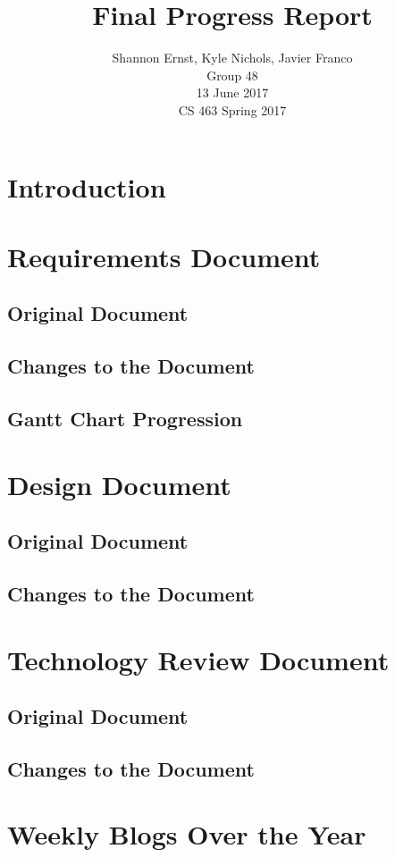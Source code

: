 \documentclass[letterpaper,10pt,serif,draftclsnofoot,onecolumn,compsoc,titlepage]{IEEEtran}
\title{Final Progress Report}
\author{Shannon Ernst, Kyle Nichols, Javier Franco\\ Group 48 \\ 13 June 2017 \\ CS 463 Spring 2017}
\begin{document}
\maketitle
\begin{abstract}

\end{abstract}
\newpage
\tableofcontents
\newpage
\section{Introduction}
\section{Requirements Document}
\subsection{Original Document}
%
\subsection{Changes to the Document}
\subsection{Gantt Chart Progression}
\section{Design Document}
\subsection{Original Document}
\subsection{Changes to the Document}
\section{Technology Review Document}
\subsection{Original Document}
\subsection{Changes to the Document}
\section{Weekly Blogs Over the Year}



\end{document}
